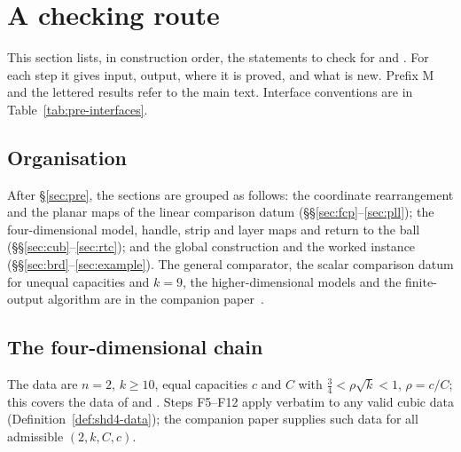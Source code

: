 \section{A checking route}\label{sec:guide}

\begingroup\sloppy

This section lists, in construction order, the statements to check for  and
. For each step it gives input, output, where it is proved, and what is new. Prefix M
and the lettered results refer to the main text. Interface conventions are in Table~\ref{tab:pre-interfaces}.

\subsection*{Organisation}

After \S\ref{sec:pre}, the sections are grouped as follows: the coordinate rearrangement and the planar maps of the
linear comparison datum (\S\S\ref{sec:fcp}--\ref{sec:pll}); the four-dimensional model, handle, strip and layer maps
and return to the ball (\S\S\ref{sec:cub}--\ref{sec:rtc}); and the global construction and the worked instance
(\S\S\ref{sec:brd}--\ref{sec:example}). The general comparator, the scalar comparison datum for unequal capacities and
$k=9$, the higher-dimensional models and the finite-output algorithm are in the companion paper~\cite{SongHD}.

\subsection{The four-dimensional chain}\label{sec:guide-four}

The data are $n=2$, $k\ge10$, equal capacities $c$ and $C$ with $\frac34<\rho\sqrt k<1$, $\rho=c/C$; this covers the
data of  and . Steps F5--F12 apply verbatim to any valid
cubic data (Definition~\ref{def:shd4-data}); the companion paper supplies such data for all admissible
$(2,k,C,c)$.

